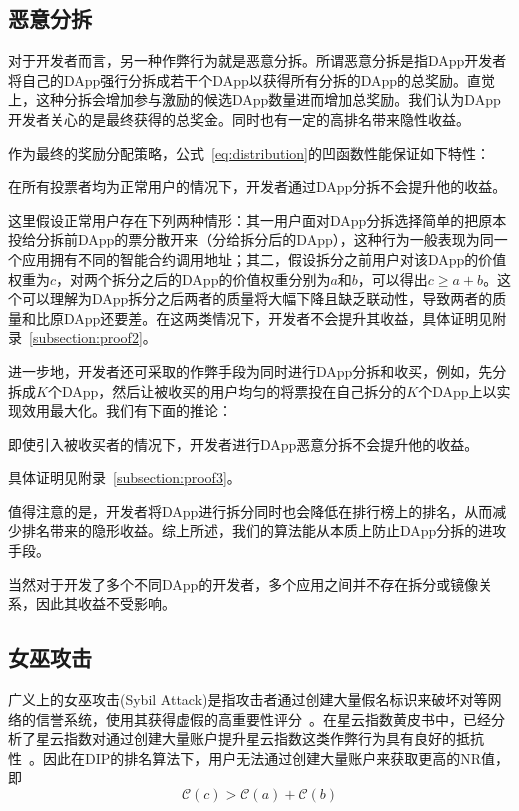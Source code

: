 \subsection{恶意分拆}
\label{subsec:5.2}

对于开发者而言，另一种作弊行为就是恶意分拆。所谓恶意分拆是指DApp开发者将自己的DApp强行分拆成若干个DApp以获得所有分拆的DApp的总奖励。直觉上，这种分拆会增加参与激励的候选DApp数量进而增加总奖励。我们认为DApp开发者关心的是最终获得的总奖金。同时也有一定的高排名带来隐性收益。

作为最终的奖励分配策略，公式~\ref{eq:distribution}的凹函数性能保证如下特性：
\begin{property}
\label{p2}
	在所有投票者均为正常用户的情况下，开发者通过DApp分拆不会提升他的收益。
\end{property}
这里假设正常用户存在下列两种情形：其一用户面对DApp分拆选择简单的把原本投给分拆前DApp的票分散开来（分给拆分后的DApp），这种行为一般表现为同一个应用拥有不同的智能合约调用地址；其二，假设拆分之前用户对该DApp的价值权重为$c$，对两个拆分之后的DApp的价值权重分别为$a$和$b$，可以得出$c \geq a+b$。这个可以理解为DApp拆分之后两者的质量将大幅下降且缺乏联动性，导致两者的质量和比原DApp还要差。在这两类情况下，开发者不会提升其收益，具体证明见附录~\ref{subsection:proof2}。

进一步地，开发者还可采取的作弊手段为同时进行DApp分拆和收买，例如，先分拆成$K$个DApp，然后让被收买的用户均匀的将票投在自己拆分的$K$个DApp上以实现效用最大化。我们有下面的推论：
\begin{corollary}
	\label{c1}
	即使引入被收买者的情况下，开发者进行DApp恶意分拆不会提升他的收益。
\end{corollary}
具体证明见附录~\ref{subsection:proof3}。

值得注意的是，开发者将DApp进行拆分同时也会降低在排行榜上的排名，从而减少排名带来的隐形收益。综上所述，我们的算法能从本质上防止DApp分拆的进攻手段。

当然对于开发了多个不同DApp的开发者，多个应用之间并不存在拆分或镜像关系，因此其收益不受影响。

\subsection{女巫攻击}
广义上的女巫攻击(Sybil Attack)是指攻击者通过创建大量假名标识来破坏对等网络的信誉系统，使用其获得虚假的高重要性评分~\cite{quercia2010sybil}。在星云指数黄皮书中，已经分析了星云指数对通过创建大量账户提升星云指数这类作弊行为具有良好的抵抗性~\cite{Nebulasyellowpaper}。因此在DIP的排名算法下，用户无法通过创建大量账户来获取更高的NR值，即%
$$\mathcal{C}(c)>\mathcal{C}(a)+\mathcal{C}(b)$$

